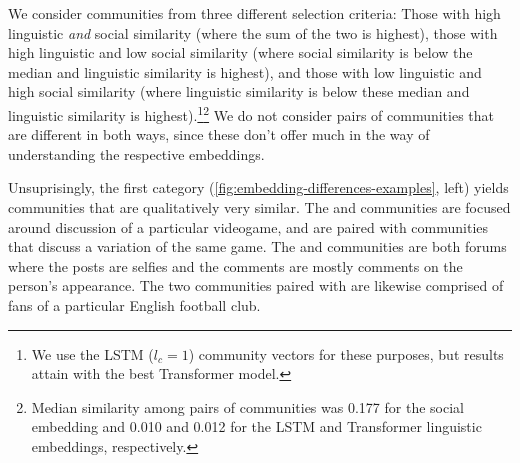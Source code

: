 \documentclass[11pt]{article}
\begin{document}
We consider communities from three different selection criteria: 
Those with high linguistic \emph{and} social similarity 
(where the sum of the two is highest),
those with high linguistic and low social similarity
(where social similarity is below the median and linguistic similarity is highest), and
those with low linguistic and high social similarity
(where linguistic similarity is below these median and linguistic similarity is highest).\footnote{We use the LSTM ($l_c=1$) community vectors for these purposes, 
  but results attain with the best Transformer model.}\footnote{Median similarity
  among pairs of communities was \num{0.177} for the social embedding
  and \num{0.010} and \num{0.012} for the LSTM and Transformer
  linguistic embeddings, respectively.}
We do not consider pairs of communities that are different in both ways,
since these don't offer much in the way of understanding the respective embeddings.

Unsuprisingly, the first category (\cref{fig:embedding-differences-examples}, left) yields communities that are qualitatively very similar. 
The  and  communities are focused
around discussion of a particular videogame, and are paired
with communities that discuss a variation of the same game.
The  and  communities are both 
forums where the posts are selfies and the comments are mostly 
comments on the person's appearance.
The two communities paired with  are 
likewise comprised of fans of a particular English football club.
\end{document}
